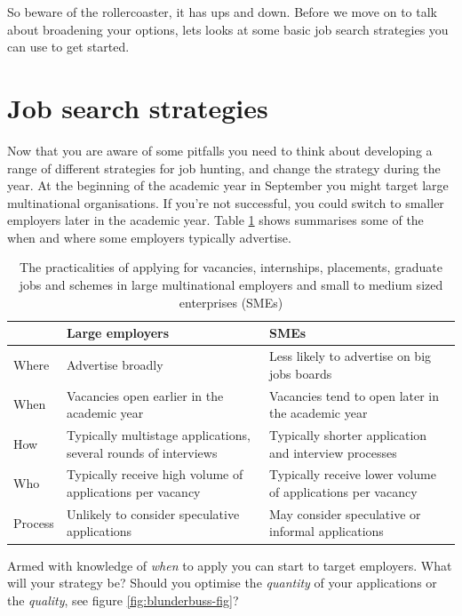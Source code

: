 \documentclass[
]{book}
\begin{document}
So beware of the rollercoaster, it has ups and down. Before we move on to talk about broadening your options, lets looks at some basic job search strategies you can use to get started.

\hypertarget{strategies}{%
\section{Job search strategies}\label{strategies}}

Now that you are aware of some pitfalls you need to think about developing a range of different strategies for job hunting, and change the strategy during the year. At the beginning of the academic year in September you might target large multinational organisations. If you're not successful, you could switch to smaller employers later in the academic year. Table \ref{tab:shortcuts} shows summarises some of the when and where some employers typically advertise.

\begin{table}

\caption{\label{tab:shortcuts}The practicalities of applying for vacancies, internships, placements, graduate jobs and schemes in large multinational employers and small to medium sized enterprises (SMEs)}
\centering
\begin{tabular}[t]{lll}
\toprule
 & Large employers & SMEs\\
\midrule
Where & Advertise broadly & Less likely to advertise on big jobs boards\\
When & Vacancies open earlier in the academic year & Vacancies tend to open later in the academic year\\
How & Typically multistage applications, several rounds of interviews & Typically shorter application and interview processes\\
Who & Typically receive high volume of applications per vacancy & Typically receive lower volume of applications per vacancy\\
Process & Unlikely to consider speculative applications & May consider speculative or informal applications\\
\bottomrule
\end{tabular}
\end{table}

Armed with knowledge of \emph{when} to apply you can start to target employers. What will your strategy be? Should you optimise the \emph{quantity} of your applications or the \emph{quality}, see figure \ref{fig:blunderbuss-fig}?
\end{document}
